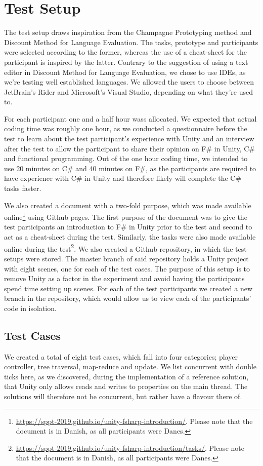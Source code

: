 \section{Test Setup}
The test setup draws inspiration from the Champagne Prototyping method and Discount Method for Language Evaluation. The tasks, prototype and participants were selected according to the former, whereas the use of a cheat-sheet for the participant is inspired by the latter. Contrary to the suggestion of using a text editor in Discount Method for Language Evaluation, we chose to use \glspl{IDE}, as we're testing well established languages. We allowed the users to choose between JetBrain's Rider and Microsoft's Visual Studio, depending on what they're used to.

For each participant one and a half hour wass allocated. We expected that actual coding time was roughly one hour, as we conducted a questionnaire before the test to learn about the test participant's experience with Unity and an interview after the test to allow the participant to share their opinion on F\# in Unity, C\# and functional programming. Out of the one hour coding time, we intended to use 20 minutes on C\# and 40 minutes on F\#, as the participants are required to have experience with C\# in Unity and therefore likely will complete the C\# tasks faster.

We also created a document with a two-fold purpose, which was made available online\footnote{\url{https://sppt-2019.github.io/unity-fsharp-introduction/}. Please note that the document is in Danish, as all participants were Danes.} using Github pages. The first purpose of the document was to give the test participants an introduction to F\# in Unity prior to the test and second to act as a cheat-sheet during the test. Similarly, the tasks were also made available online during the test\footnote{\url{https://sppt-2019.github.io/unity-fsharp-introduction/tasks/}. Please note that the document is in Danish, as all participants were Danes.}. We also created a Github repository, in which the test-setups were stored. The master branch of said repository holds a Unity project with eight scenes, one for each of the test cases. The purpose of this setup is to remove Unity as a factor in the experiment and avoid having the participants spend time setting up scenes. For each of the test participants we created a new branch in the repository, which would allow us to view each of the participants' code in isolation.
 
\subsection{Test Cases}
We created a total of eight test cases, which fall into four categories; player controller, tree traversal, map-reduce and  update. We list concurrent with double ticks here, as we discovered, during the implementation of a reference solution, that Unity only allows reads and writes to  properties on the main thread. The solutions will therefore not be concurrent, but rather have a flavour there of.

